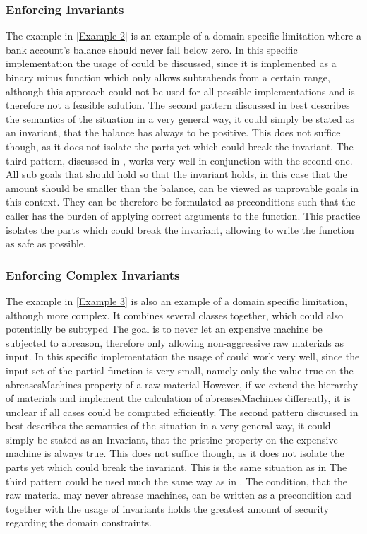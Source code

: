 \subsubsection{Enforcing Invariants} \label{Problem 2}
The example in \ref{Example 2} is an example of a domain specific limitation where a bank account's balance should never fall below zero. In this specific implementation the usage of  could be discussed, since it is implemented as a binary minus function which only allows subtrahends from a certain range, although this approach could not be used for all possible implementations and is therefore not a feasible solution. \newline
The second pattern discussed in  best describes the semantics of the situation in a very general way, it could simply be stated as an invariant, that the balance has always to be positive. This does not suffice though, as it does not isolate the parts yet which could break the invariant. \newline
The third pattern, discussed in , works very well in conjunction with the second one. All sub goals that should hold so that the invariant holds, in this case that the amount should be smaller than the balance, can be viewed as unprovable goals in this context. They can be therefore be formulated as preconditions such that the caller has the burden of applying correct arguments to the function. This practice isolates the parts which could break the invariant, allowing to write the function as safe as possible.

\subsubsection{Enforcing Complex Invariants}
The example in \ref{Example 3} is also an example of a domain specific limitation, although more complex. It combines several classes together, which could also potentially be subtyped The goal is to never let an expensive machine be subjected to abreason, therefore only allowing non-aggressive raw materials as input. In this specific implementation the usage of  could work very well, since the input set of the partial function is very small, namely only the value true on the abreasesMachines property of a raw material However, if we extend the hierarchy of materials and implement the calculation of abreasesMachines differently, it is unclear if all cases could be computed efficiently. \newline
The second pattern discussed in  best describes the semantics of the situation in a very general way, it could simply be stated as an Invariant, that the pristine property on the expensive machine is always true. This does not suffice though, as it does not isolate the parts yet which could break the invariant. This is the same situation as in  \newline
The third pattern could be used much the same way as in . The condition, that the raw material may never abrease machines, can be written as a precondition and together with the usage of invariants holds the greatest amount of security regarding the domain constraints.

